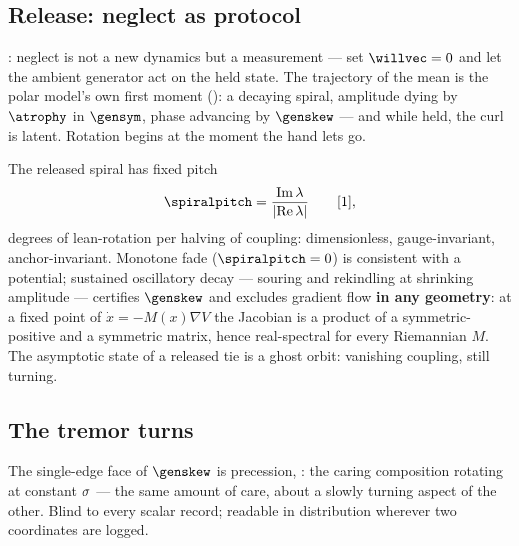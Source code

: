\documentclass[../main]{subfiles}
\begin{document}
\subsection{Release: neglect as protocol}
\label{subsec:osc:release}
%
: neglect is not a new dynamics but a measurement --- set
$\willvec=0$ and let the ambient generator act on the held state. The trajectory of
the mean is the polar model's own first moment (): a decaying
spiral, amplitude dying by $\atrophy$ in $\gensym$, phase advancing by $\genskew$ ---
and while held, the curl is latent. Rotation begins at the moment the hand lets go.

\begin{definition}
  The released spiral has fixed pitch
  \begin{equation}
    \spiralpitch=\frac{\operatorname{Im}\eigval}{\lvert\operatorname{Re}\eigval\rvert}
    \qquad\dimratio,
    \label{eq:dyn:pitch}
  \end{equation}
  degrees of lean-rotation per halving of coupling: dimensionless, gauge-invariant,
  anchor-invariant. Monotone fade ($\spiralpitch=0$) is consistent with a potential;
  sustained oscillatory decay --- souring and rekindling at shrinking amplitude ---
  certifies $\genskew$ and excludes gradient flow \textbf{in any geometry}: at a fixed
  point of $\dot x=-M(x)\nabla V$ the Jacobian is a product of a symmetric-positive and a
  symmetric matrix, hence real-spectral for every Riemannian $M$. The asymptotic state of
  a released tie is a ghost orbit: vanishing coupling, still turning.
\end{definition}

\subsection{The tremor turns}
\label{subsec:osc:tremor}
%
The single-edge face of $\genskew$ is precession, : the caring
composition rotating at constant $\sigma$ --- the same amount of care, about a slowly
turning aspect of the other. Blind to every scalar record; readable in distribution
wherever two coordinates are logged.
\end{document}
